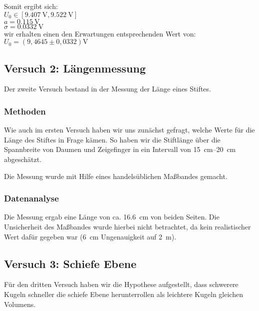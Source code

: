 \documentclass[11pt,a4paper,titlepage, ngerman]{article}
\begin{document}
			\begin{flushleft}
				Somit ergibt sich:\\
		
				\vspace{0.5cm}
				$U_0 \in [\SI{9.407}{\V},\SI{9.522}{\V}]$\\
				$a = \SI{0.115}{\V}$ \\
				$\sigma = \SI{0,0332}{\V}$ \\
				\vspace{0.5cm}
				wir erhalten einen den Erwartungen entsprechenden Wert von: \\ 
				\vspace{0.5cm}
				$U_0 = (9,4645 \pm 0,0332)\si{\V}$\\ %
			\end{flushleft}
	
	\subsection{Versuch 2: Längenmessung}
		Der zweite Versuch bestand in der Messung der Länge eines Stiftes.
		
		\subsubsection{Methoden}
			Wie auch im ersten Versuch haben wir uns zunächst gefragt, welche Werte für die Länge des Stiftes in Frage kämen.
			So haben wir die Stiftlänge über die Spannbreite von Daumen und Zeigefinger in ein Intervall von \SIrange{15}{20}{\cm} abgeschätzt.
			
			Die Messung wurde mit Hilfe eines handelsüblichen Maßbandes gemacht.
			
		\subsubsection{Datenanalyse}
			Die Messung ergab eine Länge von ca. \SI{16,6}{\cm} von beiden Seiten. Die Unsicherheit des Maßbandes wurde hierbei nicht betrachtet, da kein realistischer Wert dafür gegeben war (\SI{6}{\cm} Ungenauigkeit auf \SI{2}{\m}).
		
	\subsection{Versuch 3: Schiefe Ebene}
		Für den dritten Versuch haben wir die Hypothese aufgestellt, dass schwerere Kugeln schneller die schiefe Ebene herunterrollen als leichtere Kugeln gleichen Volumens.
		
\end{document}
